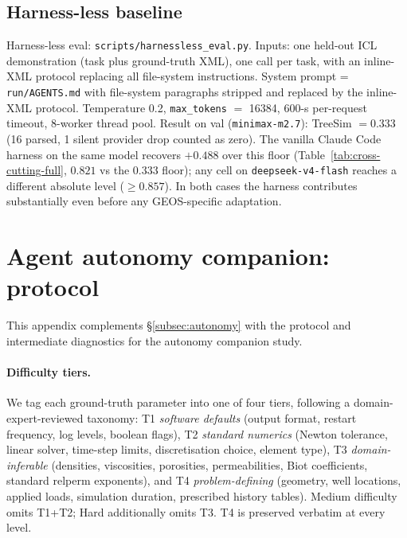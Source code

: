 \documentclass{article}
\begin{document}
\subsection{Harness-less baseline}
\label{subsec:harnessless}
Harness-less eval: \texttt{scripts/harnessless\_eval.py}. Inputs: one held-out ICL demonstration (task plus ground-truth XML), one call per task, with an inline-XML protocol replacing all file-system instructions. System prompt = \texttt{run/AGENTS.md} with file-system paragraphs stripped and replaced by the inline-XML protocol. Temperature 0.2, \texttt{max\_tokens} $=$ 16384, 600-s per-request timeout, 8-worker thread pool. Result on val (\texttt{minimax-m2.7}): TreeSim $= 0.333$ (16 parsed, 1 silent provider drop counted as zero). The vanilla Claude Code harness on the same model recovers ${+}0.488$ over this floor (Table~\ref{tab:cross-cutting-full}, $0.821$ vs the $0.333$ floor); any cell on \texttt{deepseek-v4-flash} reaches a different absolute level ($\geq 0.857$). In both cases the harness contributes substantially even before any GEOS-specific adaptation.

\section{Agent autonomy companion: protocol}
\label{app:autonomy}

This appendix complements \S\ref{subsec:autonomy} with the protocol and intermediate diagnostics for the autonomy companion study.

\paragraph{Difficulty tiers.} We tag each ground-truth parameter into one of four tiers, following a domain-expert-reviewed taxonomy: T1 \emph{software defaults} (output format, restart frequency, log levels, boolean flags), T2 \emph{standard numerics} (Newton tolerance, linear solver, time-step limits, discretisation choice, element type), T3 \emph{domain-inferable} (densities, viscosities, porosities, permeabilities, Biot coefficients, standard relperm exponents), and T4 \emph{problem-defining} (geometry, well locations, applied loads, simulation duration, prescribed history tables). Medium difficulty omits T1+T2; Hard additionally omits T3. T4 is preserved verbatim at every level.
\end{document}
